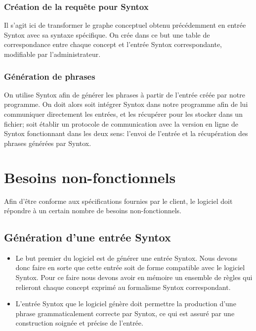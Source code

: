 \documentclass[12pt]{report}
\begin{document}
\subsubsection{Création de la requête pour Syntox}

Il s'agit ici de transformer le graphe conceptuel obtenu précédemment en entrée Syntox avec sa syntaxe spécifique. On crée dans ce but une table de correspondance entre chaque concept et l'entrée Syntox correspondante, modifiable par l'administrateur.

\subsubsection{Génération de phrases}

On utilise Syntox afin de générer les phrases à partir de l'entrée créée par notre programme.
On doit alors soit intégrer Syntox dans notre programme afin de lui communiquer directement les entrées, et les récupérer pour les stocker dans un fichier; soit établir un protocole de communication avec la version en ligne de Syntox fonctionnant dans les deux sens: l'envoi de l'entrée et la récupération des phrases générées par Syntox.

\section{Besoins non-fonctionnels}

Afin d'être conforme aux spécifications fournies par le client, le logiciel doit répondre à un certain nombre de besoins non-fonctionnels.

\subsection{Génération d'une entrée Syntox}

\begin{itemize}
	\item Le but premier du logiciel est de générer une entrée Syntox. Nous devons donc faire en sorte que cette entrée soit de forme compatible avec le logiciel Syntox. Pour ce faire nous devons avoir en mémoire un ensemble de règles qui relieront chaque concept exprimé au formalisme Syntox correspondant.
	\item L'entrée Syntox que le logiciel génère doit permettre la production d'une phrase grammaticalement correcte par Syntox, ce qui est assuré par une construction soignée et précise de l'entrée.
\end{itemize}
\end{document}
